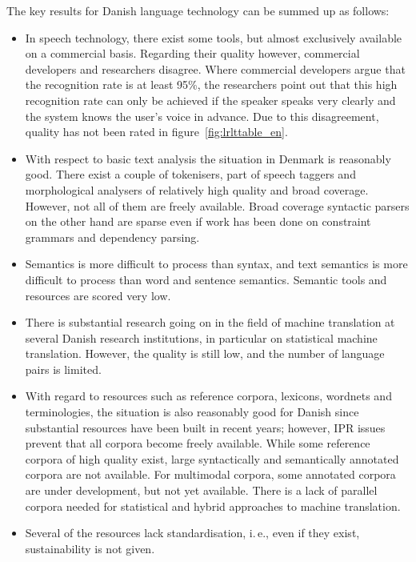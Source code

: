 \begin{multicols}{2}
The key results for Danish language technology can be summed up as follows:

\begin{itemize}
\item In speech technology, there exist some tools, but almost exclusively available on a commercial basis. Regarding their quality however, commercial developers and researchers disagree. Where commercial developers argue that the recognition rate is at least 95\%, the researchers point out that this high recognition rate can only be achieved if the speaker speaks very clearly and the system knows the user's voice in advance. Due to this disagreement, quality has not been rated in figure~\ref{fig:lrlttable_en}.
\item With respect to basic text analysis the situation in Denmark is reasonably good. There exist a couple of tokenisers, part of speech taggers and morphological analysers of relatively high quality and broad coverage.  However, not all of them are freely available. Broad coverage syntactic parsers on the other hand are sparse even if work has been done on constraint grammars and dependency parsing.
\item Semantics is more difficult to process than syntax, and text semantics is more difficult to process than word and sentence semantics. Semantic tools and resources are scored very low. 
\item There is substantial research going on in the field of machine translation at several Danish research institutions, in particular on statistical machine translation. However, the quality is still low, and the number of language pairs is limited.
\item With regard to resources such as reference corpora, lexicons, wordnets and terminologies, the situation is also reasonably good for Danish since substantial resources have been built in recent years; however, IPR issues prevent that all corpora become freely available. While some reference corpora of high quality exist, large syntactically and semantically annotated corpora are not available. For multimodal corpora, some annotated corpora are under development, but not yet available. There is a lack of parallel corpora needed for statistical and hybrid approaches to machine translation.
\item Several of the resources lack standardisation, i.\,e., even if they exist, sustainability is not given.
\end{itemize}


\end{multicols}
